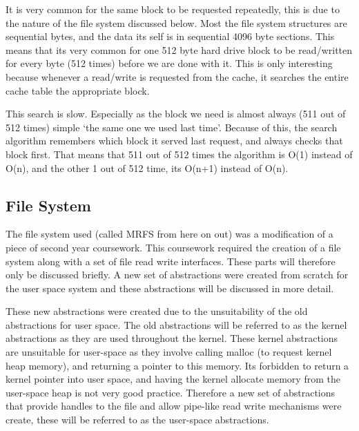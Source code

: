 \documentclass[a4paper]{report}
\begin{document}
It is very common for the same block to be requested repeatedly, this is due to the nature of the file system discussed below. Most the file system structures are sequential bytes, and the data its self is in sequential 4096 byte sections. This means that its very common for one 512 byte hard drive block to be read/written for every byte (512 times) before we are done with it. This is only interesting because whenever a read/write is requested from the cache, it searches the entire cache table the appropriate block.

This search is slow. Especially as the block we need is almost always (511 out of 512 times) simple `the same one we used last time'. Because of this, the search algorithm remembers which block it served last request, and always checks that block first. That means that 511 out of 512 times the algorithm is O(1) instead of O(n), and the other 1 out of 512 time, its O(n+1) instead of O(n).


























\subsection{File System}

The file system used (called MRFS from here on out) was a modification of a piece of second year coursework. This coursework required the creation of a file system along with a set of file read write interfaces. These parts will therefore only be discussed briefly. A new set of abstractions were created from scratch for the user space system and these abstractions will be discussed in more detail.

These new abstractions were created due to the unsuitability of the old abstractions for user space. The old abstractions will be referred to as the kernel abstractions as they are used throughout the kernel. These kernel abstractions are unsuitable for user-space as they involve calling malloc (to request kernel heap memory), and returning a pointer to this memory. Its forbidden to return a kernel pointer into user space, and having the kernel allocate memory from the user-space heap is not very good practice. Therefore a new set of abstractions that provide handles to the file and allow pipe-like read write mechanisms were create, these will be referred to as the user-space abstractions.
\end{document}
